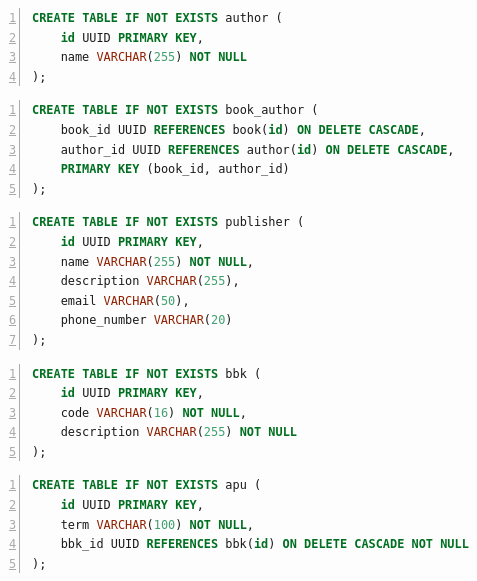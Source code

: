 \begin{center}
	\captionsetup{justification=raggedright,singlelinecheck=off}
	\begin{lstlisting}[language=sql, frame=single, numbers=left, caption=Создание таблицы author]
CREATE TABLE IF NOT EXISTS author (
	id UUID PRIMARY KEY,
	name VARCHAR(255) NOT NULL
);
	\end{lstlisting}
\end{center}

\begin{center}
	\captionsetup{justification=raggedright,singlelinecheck=off}
	\begin{lstlisting}[language=sql, frame=single, numbers=left, caption=Создание таблицы связки book\_author]
CREATE TABLE IF NOT EXISTS book_author (
	book_id UUID REFERENCES book(id) ON DELETE CASCADE,
	author_id UUID REFERENCES author(id) ON DELETE CASCADE,
	PRIMARY KEY (book_id, author_id)
);
	\end{lstlisting}
\end{center}

\begin{center}
	\captionsetup{justification=raggedright,singlelinecheck=off}
	\begin{lstlisting}[language=sql, frame=single, numbers=left, caption=Создание таблицы publisher]
CREATE TABLE IF NOT EXISTS publisher (
	id UUID PRIMARY KEY,
	name VARCHAR(255) NOT NULL,
	description VARCHAR(255),
	email VARCHAR(50),
	phone_number VARCHAR(20)
);
	\end{lstlisting}
\end{center}

\begin{center}
	\captionsetup{justification=raggedright,singlelinecheck=off}
	\begin{lstlisting}[language=sql, frame=single, numbers=left, caption=Создание таблицы bbk]
CREATE TABLE IF NOT EXISTS bbk (
	id UUID PRIMARY KEY,
	code VARCHAR(16) NOT NULL,
	description VARCHAR(255) NOT NULL
);	
	\end{lstlisting}
\end{center}

\begin{center}
	\captionsetup{justification=raggedright,singlelinecheck=off}
	\begin{lstlisting}[language=sql, frame=single, numbers=left, caption=Создание таблицы apu]
CREATE TABLE IF NOT EXISTS apu (
	id UUID PRIMARY KEY,
	term VARCHAR(100) NOT NULL,
	bbk_id UUID REFERENCES bbk(id) ON DELETE CASCADE NOT NULL
);
	\end{lstlisting}
\end{center}

